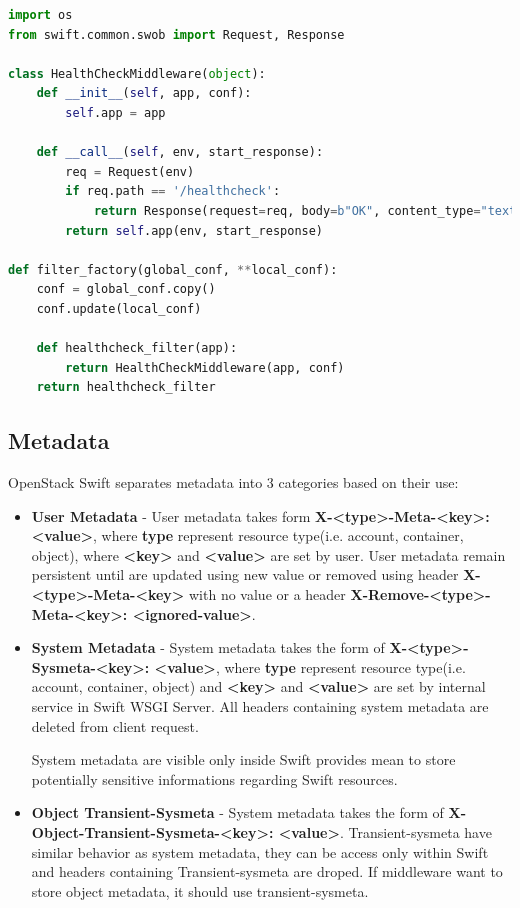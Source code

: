 \lstset{style=mystyle}

\begin{lstlisting}[language=Python]
import os
from swift.common.swob import Request, Response

class HealthCheckMiddleware(object):
    def __init__(self, app, conf):
        self.app = app

    def __call__(self, env, start_response):
        req = Request(env)
        if req.path == '/healthcheck':
            return Response(request=req, body=b"OK", content_type="text/plain")(env, start_response)
        return self.app(env, start_response)

def filter_factory(global_conf, **local_conf):
    conf = global_conf.copy()
    conf.update(local_conf)

    def healthcheck_filter(app):
        return HealthCheckMiddleware(app, conf)
    return healthcheck_filter
\end{lstlisting}

    \subsection{Metadata}
    OpenStack Swift separates metadata into 3 categories based on their use:
    \begin{itemize}
        \item \textbf{User Metadata} - User metadata takes form \textbf{X-<type>-Meta-<key>: <value>}, where \textbf{type} represent resource type(i.e. account, container, object), where \textbf{<key>} and \textbf{<value>} are set by user. User metadata remain persistent until are updated using new value or removed using header  \textbf{X-<type>-Meta-<key>} with no value or a header \textbf{X-Remove-<type>-Meta-<key>: <ignored-value>}.
        \item \textbf{System Metadata} - System metadata takes the form of \textbf{X-<type>-Sysmeta-<key>: <value>}, where \textbf{type} represent resource type(i.e. account, container, object) and \textbf{<key>} and \textbf{<value>} are set by internal service in Swift WSGI Server.
        All headers containing system metadata are deleted from client request.

        System metadata are visible only inside Swift provides mean to store potentially sensitive informations regarding Swift resources.
        \item \textbf{Object Transient-Sysmeta} - System metadata takes the form of \textbf{X-Object-Transient-Sysmeta-<key>: <value>}. Transient-sysmeta have similar behavior as system metadata, they can be access only within Swift and headers containing Transient-sysmeta are droped. If middleware want to store object metadata, it should use transient-sysmeta\cite{swiftMiddleware}.
    \end{itemize}





